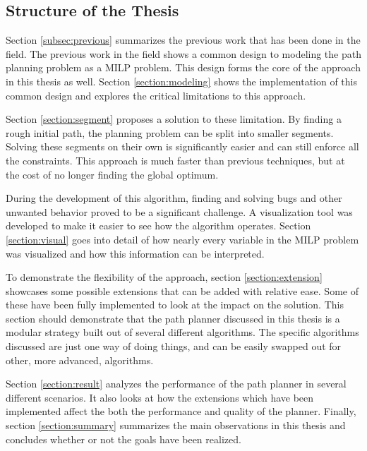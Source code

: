 \subsection{Structure of the Thesis}
Section \ref{subsec:previous} summarizes the previous work that has been done in the field.
The previous work in the field shows a common design to modeling the path planning problem as a MILP problem. This design forms the core of the approach in this thesis as well. Section \ref{section:modeling} shows the implementation of this common design and explores the critical limitations to this approach.
\par
Section \ref{section:segment} proposes a solution to these limitation. By finding a rough initial path, the planning problem can be split into smaller segments. Solving these segments on their own is significantly easier and can still enforce all the constraints. This approach is much faster than previous techniques, but at the cost of no longer finding the global optimum.
\par
During the development of this algorithm, finding and solving bugs and other unwanted behavior proved to be a significant challenge. A visualization tool was developed to make it easier to see how the algorithm operates. Section \ref{section:visual} goes into detail of how nearly every variable in the MILP problem was visualized and how this information can be interpreted.
\par
To demonstrate the flexibility of the approach, section \ref{section:extension} showcases some possible extensions that can be added with relative ease. Some of these have been fully implemented to look at the impact on the solution. This section should demonstrate that the path planner discussed in this thesis is a modular strategy built out of several different algorithms. The specific algorithms discussed are just one way of doing things, and can be easily swapped out for other, more advanced, algorithms. 
\par
Section \ref{section:result} analyzes the performance of the path planner in several different scenarios. It also looks at how the extensions which have been implemented affect the both the performance and quality of the planner.
Finally, section \ref{section:summary} summarizes the main observations in this thesis and concludes whether or not the goals have been realized.

